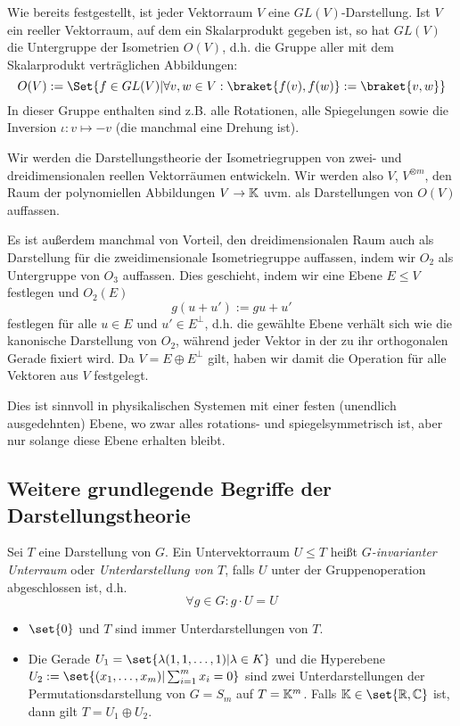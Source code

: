 \begin{example}
Wie bereits festgestellt, ist jeder Vektorraum $V$ eine $GL(V)$-Darstellung. Ist $V$ ein reeller Vektorraum, auf dem ein Skalarprodukt gegeben ist, so hat $GL(V)$ die Untergruppe der Isometrien $O(V)$, d.h. die Gruppe aller mit dem Skalarprodukt verträglichen Abbildungen:
\[O(V) := \Set{f\in GL(V) | \forall v,w\in V: \braket{f(v),f(w)} := \braket{v,w}}\]
In dieser Gruppe enthalten sind z.B. alle Rotationen, alle Spiegelungen sowie die Inversion $\iota: v\mapsto -v$ (die manchmal eine Drehung ist).

\smallbreak
Wir werden die Darstellungstheorie der Isometriegruppen von zwei- und dreidimensionalen reellen Vektorräumen entwickeln. Wir werden also $V$, $V^{\otimes m}$, den Raum der polynomiellen Abbildungen $V\to\mathbb{K}$ uvm. als Darstellungen von $O(V)$ auffassen.

\smallbreak
Es ist außerdem manchmal von Vorteil, den dreidimensionalen Raum auch als Darstellung für die zweidimensionale Isometriegruppe auffassen, indem wir $O_2$ als Untergruppe von $O_3$ auffassen. Dies geschieht, indem wir eine Ebene $E\leq V$ festlegen und $O_2(E)$
\[g(u+u') := gu + u'\]
festlegen für alle $u\in E$ und $u'\in E^\perp$, d.h. die gewählte Ebene verhält sich wie die kanonische Darstellung von $O_2$, während jeder Vektor in der zu ihr orthogonalen Gerade fixiert wird. Da $V=E\oplus E^\perp$ gilt, haben wir damit die Operation für alle Vektoren aus $V$ festgelegt.

\medbreak
Dies ist sinnvoll in physikalischen Systemen mit einer festen (unendlich ausgedehnten) Ebene, wo zwar alles rotations- und spiegelsymmetrisch ist, aber nur solange diese Ebene erhalten bleibt.
\end{example}

\subsection{Weitere grundlegende Begriffe der Darstellungstheorie}
\begin{definition}[Unterdarstellungen]
Sei $T$ eine Darstellung von $G$. Ein Untervektorraum $U\leq T$ heißt \emph{$G$-invarianter Unterraum} oder \emph{Unterdarstellung von $T$}, falls $U$ unter der Gruppenoperation abgeschlossen ist, d.h.
\[\forall g\in G: g\cdot U = U\]
\end{definition}

\begin{example}
\begin{itemize}
\item $\set{0}$ und $T$ sind immer Unterdarstellungen von $T$.
\item Die Gerade $U_1=\set{\lambda(1,1,\ldots,1) | \lambda\in K}$ und die Hyperebene $U_2 := \set{(x_1,\ldots,x_m) | \sum_{i=1}^m x_i = 0}$ sind zwei Unterdarstellungen der Permutationsdarstellung von $G=S_m$ auf $T=\mathbb{K}^m$. Falls $\IK\in\set{\IR,\IC}$ ist, dann gilt $T=U_1\oplus U_2$.
\end{itemize}
\end{example}

